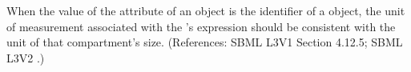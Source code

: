 When the value of the attribute  of an \EventAssignment
object is the identifier of a \Compartment object, the unit of measurement
associated with the \EventAssignment's  expression should be
consistent with the unit of that compartment's size.  (References: SBML L3V1 Section 4.12.5; SBML
L3V2 .)
